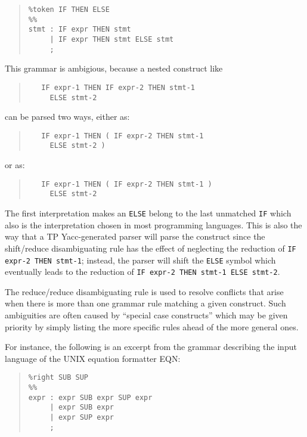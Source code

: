 \begin{quote}\begin{verbatim}
%token IF THEN ELSE
%%
stmt : IF expr THEN stmt
     | IF expr THEN stmt ELSE stmt
     ;
\end{verbatim}\end{quote}

This grammar is ambigious, because a nested construct like
\begin{quote}\begin{verbatim}
   IF expr-1 THEN IF expr-2 THEN stmt-1
     ELSE stmt-2
\end{verbatim}\end{quote}
can be parsed two ways, either as:
\begin{quote}\begin{verbatim}
   IF expr-1 THEN ( IF expr-2 THEN stmt-1
     ELSE stmt-2 )
\end{verbatim}\end{quote}
or as:
\begin{quote}\begin{verbatim}
   IF expr-1 THEN ( IF expr-2 THEN stmt-1 )
     ELSE stmt-2
\end{verbatim}\end{quote}

The first interpretation makes an \verb"ELSE" belong to the last unmatched
\verb"IF" which also is the interpretation chosen in most programming
languages. This is also the way that a TP Yacc-generated parser will parse
the construct since the shift/reduce disambiguating rule has the effect of
neglecting the reduction of \verb"IF expr-2 THEN stmt-1"; instead, the parser
will shift the \verb"ELSE" symbol which eventually leads to the reduction of
\verb"IF expr-2 THEN stmt-1 ELSE stmt-2".

The reduce/reduce disambiguating rule is used to resolve conflicts that
arise when there is more than one grammar rule matching a given construct.
Such ambiguities are often caused by ``special case constructs'' which may be
given priority by simply listing the more specific rules ahead of the more
general ones.

For instance, the following is an excerpt from the grammar describing the
input language of the UNIX equation formatter EQN:

\begin{quote}\begin{verbatim}
%right SUB SUP
%%
expr : expr SUB expr SUP expr
     | expr SUB expr
     | expr SUP expr
     ;
\end{verbatim}\end{quote}

